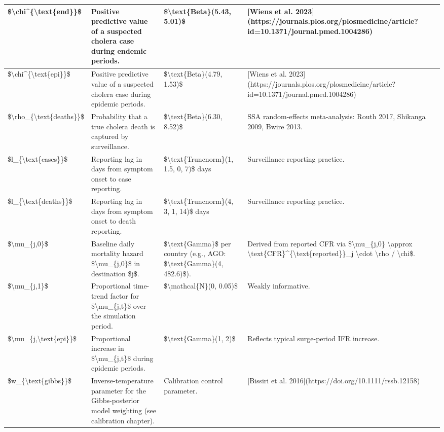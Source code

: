 \documentclass[
]{book}
\begin{document}
\begin{table}
\begin{tabular}[t]{l|l|l|l}
\hline
\$\textbackslash{}chi\textasciicircum{}\{\textbackslash{}text\{end\}\}\$ & Positive predictive value of a suspected cholera case during endemic periods. & \$\textbackslash{}text\{Beta\}(5.43, 5.01)\$ & [Wiens et al. 2023](https://journals.plos.org/plosmedicine/article?id=10.1371/journal.pmed.1004286)\\
\hline
\$\textbackslash{}chi\textasciicircum{}\{\textbackslash{}text\{epi\}\}\$ & Positive predictive value of a suspected cholera case during epidemic periods. & \$\textbackslash{}text\{Beta\}(4.79, 1.53)\$ & [Wiens et al. 2023](https://journals.plos.org/plosmedicine/article?id=10.1371/journal.pmed.1004286)\\
\hline
\$\textbackslash{}rho\_\{\textbackslash{}text\{deaths\}\}\$ & Probability that a true cholera death is captured by surveillance. & \$\textbackslash{}text\{Beta\}(6.30, 8.52)\$ & SSA random-effects meta-analysis: Routh 2017, Shikanga 2009, Bwire 2013.\\
\hline
\$l\_\{\textbackslash{}text\{cases\}\}\$ & Reporting lag in days from symptom onset to case reporting. & \$\textbackslash{}text\{Truncnorm\}(1, 1.5, 0, 7)\$ days & Surveillance reporting practice.\\
\hline
\$l\_\{\textbackslash{}text\{deaths\}\}\$ & Reporting lag in days from symptom onset to death reporting. & \$\textbackslash{}text\{Truncnorm\}(4, 3, 1, 14)\$ days & Surveillance reporting practice.\\
\hline
\$\textbackslash{}mu\_\{j,0\}\$ & Baseline daily mortality hazard \$\textbackslash{}mu\_\{j,0\}\$ in destination \$j\$. & \$\textbackslash{}text\{Gamma\}\$ per country (e.g., AGO: \$\textbackslash{}text\{Gamma\}(4, 482.6)\$). & Derived from reported CFR via \$\textbackslash{}mu\_\{j,0\} \textbackslash{}approx \textbackslash{}text\{CFR\}\textasciicircum{}\{\textbackslash{}text\{reported\}\}\_j \textbackslash{}cdot \textbackslash{}rho / \textbackslash{}chi\$.\\
\hline
\$\textbackslash{}mu\_\{j,1\}\$ & Proportional time-trend factor for \$\textbackslash{}mu\_\{j,t\}\$ over the simulation period. & \$\textbackslash{}mathcal\{N\}(0, 0.05)\$ & Weakly informative.\\
\hline
\$\textbackslash{}mu\_\{j,\textbackslash{}text\{epi\}\}\$ & Proportional increase in \$\textbackslash{}mu\_\{j,t\}\$ during epidemic periods. & \$\textbackslash{}text\{Gamma\}(1, 2)\$ & Reflects typical surge-period IFR increase.\\
\hline
\$w\_\{\textbackslash{}text\{gibbs\}\}\$ & Inverse-temperature parameter for the Gibbs-posterior model weighting (see calibration chapter). & Calibration control parameter. & [Bissiri et al. 2016](https://doi.org/10.1111/rssb.12158)\\
\hline
\end{tabular}
\end{table}
\end{document}
